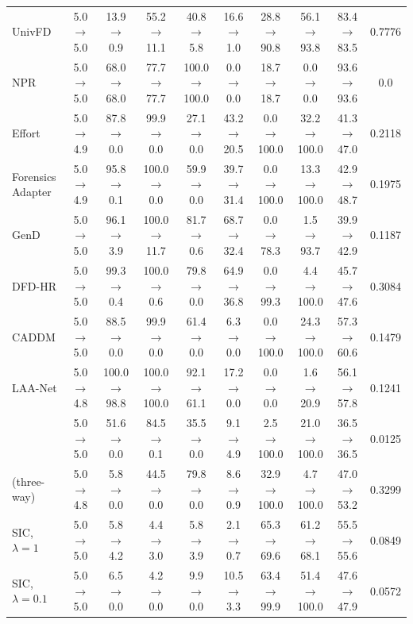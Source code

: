 \begin{tabular}{@{}l ccccc ccc c@{}}
UnivFD & 5.0 $\rightarrow$ 5.0 & 13.9 $\rightarrow$ 0.9 & 55.2 $\rightarrow$ 11.1 & 40.8 $\rightarrow$ 5.8 & 16.6 $\rightarrow$ 1.0 & 28.8 $\rightarrow$ 90.8 & 56.1 $\rightarrow$ 93.8 & 83.4 $\rightarrow$ 83.5 & 0.7776 \\
NPR & 5.0 $\rightarrow$ 5.0 & 68.0 $\rightarrow$ 68.0 & 77.7 $\rightarrow$ 77.7 & 100.0 $\rightarrow$ 100.0 & 0.0 $\rightarrow$ 0.0 & 18.7 $\rightarrow$ 18.7 & 0.0 $\rightarrow$ 0.0 & 93.6 $\rightarrow$ 93.6 & 0.0 \\
Effort & 5.0 $\rightarrow$ 4.9 & 87.8 $\rightarrow$ 0.0 & 99.9 $\rightarrow$ 0.0 & 27.1 $\rightarrow$ 0.0 & 43.2 $\rightarrow$ 20.5 & 0.0 $\rightarrow$ 100.0 & 32.2 $\rightarrow$ 100.0 & 41.3 $\rightarrow$ 47.0 & 0.2118 \\
Forensics Adapter & 5.0 $\rightarrow$ 4.9 & 95.8 $\rightarrow$ 0.1 & 100.0 $\rightarrow$ 0.0 & 59.9 $\rightarrow$ 0.0 & 39.7 $\rightarrow$ 31.4 & 0.0 $\rightarrow$ 100.0 & 13.3 $\rightarrow$ 100.0 & 42.9 $\rightarrow$ 48.7 & 0.1975 \\
GenD & 5.0 $\rightarrow$ 5.0 & 96.1 $\rightarrow$ 3.9 & 100.0 $\rightarrow$ 11.7 & 81.7 $\rightarrow$ 0.6 & 68.7 $\rightarrow$ 32.4 & 0.0 $\rightarrow$ 78.3 & 1.5 $\rightarrow$ 93.7 & 39.9 $\rightarrow$ 42.9 & 0.1187 \\
DFD-HR & 5.0 $\rightarrow$ 5.0 & 99.3 $\rightarrow$ 0.4 & 100.0 $\rightarrow$ 0.6 & 79.8 $\rightarrow$ 0.0 & 64.9 $\rightarrow$ 36.8 & 0.0 $\rightarrow$ 99.3 & 4.4 $\rightarrow$ 100.0 & 45.7 $\rightarrow$ 47.6 & 0.3084 \\
CADDM & 5.0 $\rightarrow$ 5.0 & 88.5 $\rightarrow$ 0.0 & 99.9 $\rightarrow$ 0.0 & 61.4 $\rightarrow$ 0.0 & 6.3 $\rightarrow$ 0.0 & 0.0 $\rightarrow$ 100.0 & 24.3 $\rightarrow$ 100.0 & 57.3 $\rightarrow$ 60.6 & 0.1479 \\
LAA-Net & 5.0 $\rightarrow$ 4.8 & 100.0 $\rightarrow$ 98.8 & 100.0 $\rightarrow$ 100.0 & 92.1 $\rightarrow$ 61.1 & 17.2 $\rightarrow$ 0.0 & 0.0 $\rightarrow$ 0.0 & 1.6 $\rightarrow$ 20.9 & 56.1 $\rightarrow$ 57.8 & 0.1241 \\
\oursB{} & 5.0 $\rightarrow$ 5.0 & 51.6 $\rightarrow$ 0.0 & 84.5 $\rightarrow$ 0.1 & 35.5 $\rightarrow$ 0.0 & 9.1 $\rightarrow$ 4.9 & 2.5 $\rightarrow$ 100.0 & 21.0 $\rightarrow$ 100.0 & 36.5 $\rightarrow$ 36.5 & 0.0125 \\
\ours{} (three-way) & 5.0 $\rightarrow$ 4.8 & 5.8 $\rightarrow$ 0.0 & 44.5 $\rightarrow$ 0.0 & 79.8 $\rightarrow$ 0.0 & 8.6 $\rightarrow$ 0.9 & 32.9 $\rightarrow$ 100.0 & 4.7 $\rightarrow$ 100.0 & 47.0 $\rightarrow$ 53.2 & 0.3299 \\
SIC, $\lambda=1$ & 5.0 $\rightarrow$ 5.0 & 5.8 $\rightarrow$ 4.2 & 4.4 $\rightarrow$ 3.0 & 5.8 $\rightarrow$ 3.9 & 2.1 $\rightarrow$ 0.7 & 65.3 $\rightarrow$ 69.6 & 61.2 $\rightarrow$ 68.1 & 55.5 $\rightarrow$ 55.6 & 0.0849 \\
SIC, $\lambda=0.1$ & 5.0 $\rightarrow$ 5.0 & 6.5 $\rightarrow$ 0.0 & 4.2 $\rightarrow$ 0.0 & 9.9 $\rightarrow$ 0.0 & 10.5 $\rightarrow$ 3.3 & 63.4 $\rightarrow$ 99.9 & 51.4 $\rightarrow$ 100.0 & 47.6 $\rightarrow$ 47.9 & 0.0572 \\
\bottomrule
\end{tabular}
